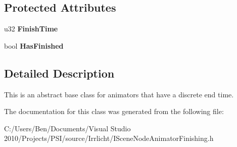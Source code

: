 \subsection*{Protected Attributes}
\begin{DoxyCompactItemize}
\item 
\hypertarget{classirr_1_1scene_1_1_i_scene_node_animator_finishing_a14cdc6523a791368c16446d7ec9139a4}{u32 {\bfseries Finish\-Time}}\label{classirr_1_1scene_1_1_i_scene_node_animator_finishing_a14cdc6523a791368c16446d7ec9139a4}

\item 
\hypertarget{classirr_1_1scene_1_1_i_scene_node_animator_finishing_afcf26f9dbba3cec83e9be0f77ca5872d}{bool {\bfseries Has\-Finished}}\label{classirr_1_1scene_1_1_i_scene_node_animator_finishing_afcf26f9dbba3cec83e9be0f77ca5872d}

\end{DoxyCompactItemize}


\subsection{Detailed Description}
This is an abstract base class for animators that have a discrete end time. 

The documentation for this class was generated from the following file\-:\begin{DoxyCompactItemize}
\item 
C\-:/\-Users/\-Ben/\-Documents/\-Visual Studio 2010/\-Projects/\-P\-S\-I/source/\-Irrlicht/I\-Scene\-Node\-Animator\-Finishing.\-h\end{DoxyCompactItemize}
